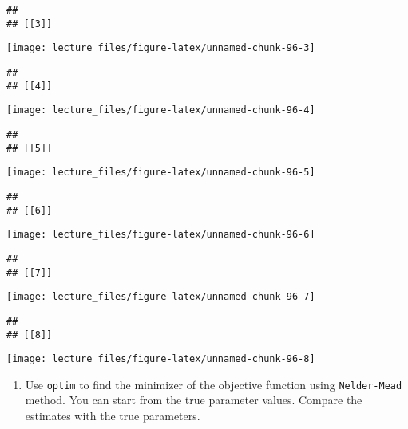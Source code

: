 \documentclass[
]{book}
\providecommand{\tightlist}{%
  \setlength{\itemsep}{0pt}\setlength{\parskip}{0pt}}
\begin{document}
\begin{verbatim}
## 
## [[3]]
\end{verbatim}

\begin{center}\texttt{[image: lecture\_files/figure-latex/unnamed-chunk-96-3]} \end{center}

\begin{verbatim}
## 
## [[4]]
\end{verbatim}

\begin{center}\texttt{[image: lecture\_files/figure-latex/unnamed-chunk-96-4]} \end{center}

\begin{verbatim}
## 
## [[5]]
\end{verbatim}

\begin{center}\texttt{[image: lecture\_files/figure-latex/unnamed-chunk-96-5]} \end{center}

\begin{verbatim}
## 
## [[6]]
\end{verbatim}

\begin{center}\texttt{[image: lecture\_files/figure-latex/unnamed-chunk-96-6]} \end{center}

\begin{verbatim}
## 
## [[7]]
\end{verbatim}

\begin{center}\texttt{[image: lecture\_files/figure-latex/unnamed-chunk-96-7]} \end{center}

\begin{verbatim}
## 
## [[8]]
\end{verbatim}

\begin{center}\texttt{[image: lecture\_files/figure-latex/unnamed-chunk-96-8]} \end{center}

\begin{enumerate}
\def\labelenumi{\arabic{enumi}.}
\setcounter{enumi}{7}
\tightlist
\item
  Use \texttt{optim} to find the minimizer of the objective function using \texttt{Nelder-Mead} method. You can start from the true parameter values. Compare the estimates with the true parameters.
\end{enumerate}
\end{document}
